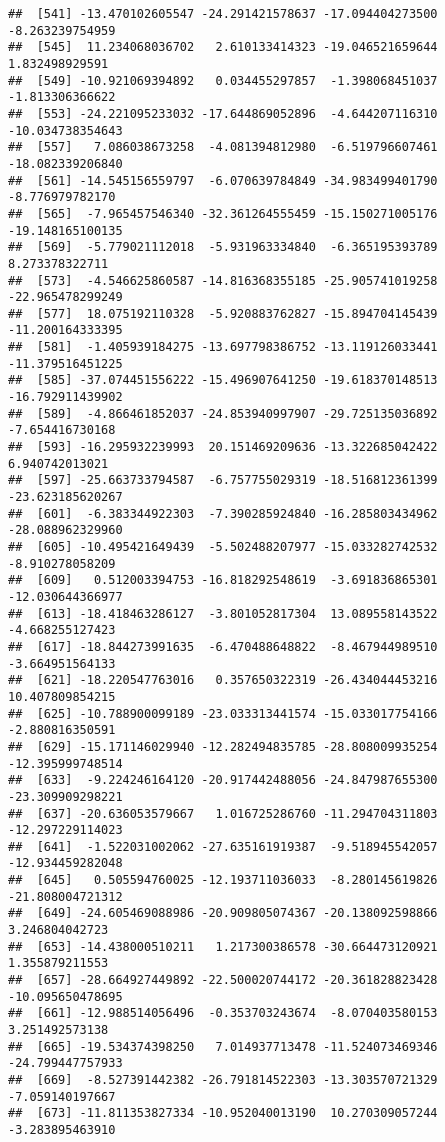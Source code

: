 \documentclass[
]{article}
\begin{document}
\begin{verbatim}
##  [541] -13.470102605547 -24.291421578637 -17.094404273500  -8.263239754959
##  [545]  11.234068036702   2.610133414323 -19.046521659644   1.832498929591
##  [549] -10.921069394892   0.034455297857  -1.398068451037  -1.813306366622
##  [553] -24.221095233032 -17.644869052896  -4.644207116310 -10.034738354643
##  [557]   7.086038673258  -4.081394812980  -6.519796607461 -18.082339206840
##  [561] -14.545156559797  -6.070639784849 -34.983499401790  -8.776979782170
##  [565]  -7.965457546340 -32.361264555459 -15.150271005176 -19.148165100135
##  [569]  -5.779021112018  -5.931963334840  -6.365195393789   8.273378322711
##  [573]  -4.546625860587 -14.816368355185 -25.905741019258 -22.965478299249
##  [577]  18.075192110328  -5.920883762827 -15.894704145439 -11.200164333395
##  [581]  -1.405939184275 -13.697798386752 -13.119126033441 -11.379516451225
##  [585] -37.074451556222 -15.496907641250 -19.618370148513 -16.792911439902
##  [589]  -4.866461852037 -24.853940997907 -29.725135036892  -7.654416730168
##  [593] -16.295932239993  20.151469209636 -13.322685042422   6.940742013021
##  [597] -25.663733794587  -6.757755029319 -18.516812361399 -23.623185620267
##  [601]  -6.383344922303  -7.390285924840 -16.285803434962 -28.088962329960
##  [605] -10.495421649439  -5.502488207977 -15.033282742532  -8.910278058209
##  [609]   0.512003394753 -16.818292548619  -3.691836865301 -12.030644366977
##  [613] -18.418463286127  -3.801052817304  13.089558143522  -4.668255127423
##  [617] -18.844273991635  -6.470488648822  -8.467944989510  -3.664951564133
##  [621] -18.220547763016   0.357650322319 -26.434044453216  10.407809854215
##  [625] -10.788900099189 -23.033313441574 -15.033017754166  -2.880816350591
##  [629] -15.171146029940 -12.282494835785 -28.808009935254 -12.395999748514
##  [633]  -9.224246164120 -20.917442488056 -24.847987655300 -23.309909298221
##  [637] -20.636053579667   1.016725286760 -11.294704311803 -12.297229114023
##  [641]  -1.522031002062 -27.635161919387  -9.518945542057 -12.934459282048
##  [645]   0.505594760025 -12.193711036033  -8.280145619826 -21.808004721312
##  [649] -24.605469088986 -20.909805074367 -20.138092598866   3.246804042723
##  [653] -14.438000510211   1.217300386578 -30.664473120921   1.355879211553
##  [657] -28.664927449892 -22.500020744172 -20.361828823428 -10.095650478695
##  [661] -12.988514056496  -0.353703243674  -8.070403580153   3.251492573138
##  [665] -19.534374398250   7.014937713478 -11.524073469346 -24.799447757933
##  [669]  -8.527391442382 -26.791814522303 -13.303570721329  -7.059140197667
##  [673] -11.811353827334 -10.952040013190  10.270309057244  -3.283895463910

\end{verbatim}
\end{document}
